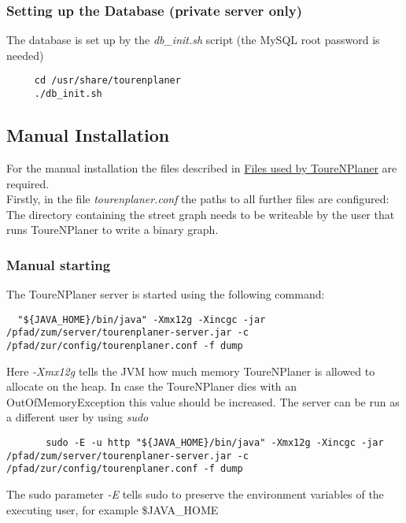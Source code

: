 \documentclass[ngerman,titlepage,parskip=true]{scrartcl}
\begin{document}
	 \subsubsection{Setting up the Database (private server only)}
	The database is set up by the \textit{db\_init.sh} script (the MySQL root password is needed)
   \begin{lstlisting}
	 cd /usr/share/tourenplaner
	 ./db_init.sh
	\end{lstlisting}
	
  \subsection{Manual Installation}
	For the manual installation the files described in \hyperref[usedfiles]{Files used by ToureNPlaner} are required.\\
	Firstly, in the file \textit{tourenplaner.conf} the paths to all further files are configured: The directory containing the street graph needs to be writeable by the user that runs ToureNPlaner to write a binary graph.
	\subsubsection{Manual starting}
  The ToureNPlaner server is started using the following command:
	\begin{lstlisting}
  "${JAVA_HOME}/bin/java" -Xmx12g -Xincgc -jar /pfad/zum/server/tourenplaner-server.jar -c /pfad/zur/config/tourenplaner.conf -f dump
	\end{lstlisting}
	Here \textit{-Xmx12g} tells the JVM how much memory ToureNPlaner is allowed to allocate on the heap. In case the ToureNPlaner dies with an OutOfMemoryException this value should be increased.
	The server can be run as a different user by using \textit{sudo}
	\begin{lstlisting}
	   sudo -E -u http "${JAVA_HOME}/bin/java" -Xmx12g -Xincgc -jar /pfad/zum/server/tourenplaner-server.jar -c /pfad/zur/config/tourenplaner.conf -f dump
	\end{lstlisting}
  The sudo parameter \textit{-E} tells sudo to preserve the environment variables of the executing user, for example \$JAVA\_HOME
\end{document}
